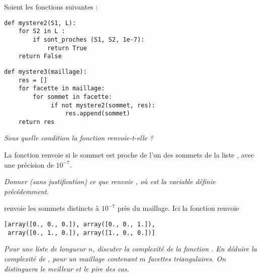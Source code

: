\medskip
Soient les fonctions suivantes :
\begin{lstlisting}
def mystere2(S1, L):
    for S2 in L :
        if sont_proches (S1, S2, 1e-7):
            return True
    return False
\end{lstlisting}

\begin{lstlisting}
def mystere3(maillage):
    res = []
    for facette in maillage:
        for sommet in facette:
             if not mystere2(sommet, res):
                 res.append(sommet)
    return res
\end{lstlisting}
\begin{Exercise}\it 
Sous quelle condition la fonction  renvoie-t-elle  ?
\end{Exercise}
\begin{Answer}
La fonction  renvoie   si le sommet  est proche de l'un des sommets de la liste , avec une précision de $10^{-7}$.
\end{Answer}
\begin{Exercise}\it 
Donner (sans justification) ce que renvoie , où  est la variable définie précédemment.
\end{Exercise}
\begin{Answer}
 renvoie les sommets distincts à $10^{-7}$ près du maillage. Ici la fonction renvoie

\begin{lstlisting}
[array([0., 0., 0.]), array([0., 0., 1.]), 
 array([0., 1., 0.]), array([1., 0., 0.])]
\end{lstlisting}
\end{Answer}
\begin{Exercise}\it 
Pour une liste  de longueur $n$, discuter la complexité de la fonction . En déduire la complexité de , pour un maillage contenant $m$ facettes triangulaires. On distinguera le meilleur et le pire des cas.
\end{Exercise}
